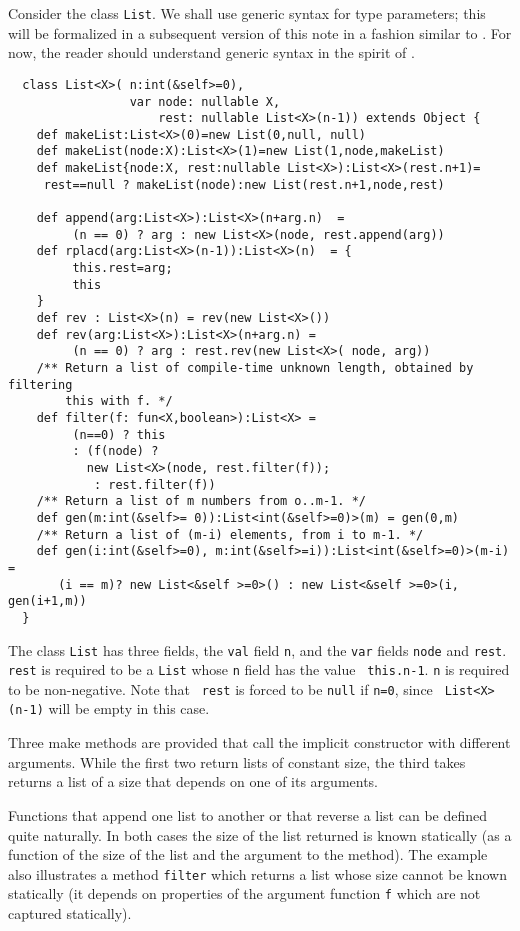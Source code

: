 \documentclass{article}
\begin{document}
\begin{example}[List]\label{List}
Consider the class {\tt List}. We shall use generic syntax for
type parameters; this will be formalized in a subsequent version 
of this note in a fashion similar to \cite{FJ}. For now, 
the reader should understand generic syntax in the spirit of \cite{FJ}.

{\footnotesize
\begin{verbatim}
  class List<X>( n:int(&self>=0), 
                 var node: nullable X, 
                     rest: nullable List<X>(n-1)) extends Object {
    def makeList:List<X>(0)=new List(0,null, null)
    def makeList(node:X):List<X>(1)=new List(1,node,makeList)
    def makeList{node:X, rest:nullable List<X>):List<X>(rest.n+1)=
     rest==null ? makeList(node):new List(rest.n+1,node,rest)

    def append(arg:List<X>):List<X>(n+arg.n)  =
         (n == 0) ? arg : new List<X>(node, rest.append(arg))
    def rplacd(arg:List<X>(n-1)):List<X>(n)  = {
         this.rest=arg;
         this
    }
    def rev : List<X>(n) = rev(new List<X>())
    def rev(arg:List<X>):List<X>(n+arg.n) = 
         (n == 0) ? arg : rest.rev(new List<X>( node, arg))
    /** Return a list of compile-time unknown length, obtained by filtering
        this with f. */
    def filter(f: fun<X,boolean>):List<X> = 
         (n==0) ? this
         : (f(node) ? 
           new List<X>(node, rest.filter(f));
            : rest.filter(f))
    /** Return a list of m numbers from o..m-1. */
    def gen(m:int(&self>= 0)):List<int(&self>=0)>(m) = gen(0,m)
    /** Return a list of (m-i) elements, from i to m-1. */
    def gen(i:int(&self>=0), m:int(&self>=i)):List<int(&self>=0)>(m-i) = 
       (i == m)? new List<&self >=0>() : new List<&self >=0>(i, gen(i+1,m))
  }  
\end{verbatim}}

The class {\tt List} has three fields, the {\tt val} field {\tt n},
and the {\tt var} fields {\tt node} and {\tt rest}. {\tt rest} is
required to be a {\tt List} whose {\tt n} field has the value {\tt
this.n-1}.  {\tt n} is required to be non-negative. Note that {\tt
rest} is forced to be {\tt null} if {\tt n=0}, since {\tt
List<X>(n-1)} will be empty in this case.

Three make methods are provided that call the implicit constructor
with different arguments. While the first two return lists of
constant size, the third takes  returns a list of a size
that depends on one of its arguments. 

Functions that append one list to another or that reverse a list can
be defined quite naturally. In both cases the size of the
list returned is known statically (as a function of the size of the
list and the argument to the method).  The example also illustrates a
method {\tt filter} which returns a list whose size cannot be known
statically (it depends on properties of the argument function {\tt f}
which are not captured statically).


\end{example}
\end{document}
